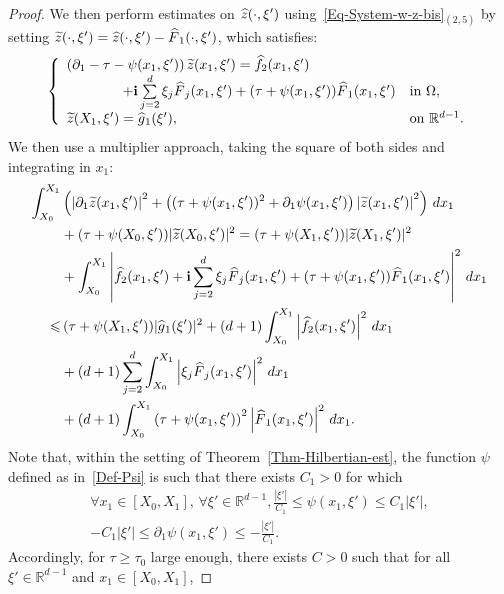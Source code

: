 \documentclass[AHL,Unicode,longabstracts]{cedram}
\newcommand*\R{\mathbb{R}}
\renewcommand{\i}{\mathbf{i}}
\renewcommand{\leq}{\leqslant}
\renewcommand{\geq}{\geqslant}
\renewcommand{\tilde}{\widetilde}
\renewcommand{\hat}{\widehat}
\let\oldtilde\tilde
\renewcommand*{\tilde}[1]{\mathchoice{\widetilde{#1}}{\widetilde{#1}}{\oldtilde{#1}}{\oldtilde{#1}}}
\let\oldhat\hat
\renewcommand*{\hat}[1]{\mathchoice{\widehat{#1}}{\widehat{#1}}{\oldhat{#1}}{\oldhat{#1}}}
\let\oldforall\forall
\renewcommand*{\forall}{\mathrel{\oldforall}}
\begin{document}
\begin{proof}
We then perform estimates on $\hat z(\cdot, \xi') $ using~\eqref{Eq-System-w-z-bis}$_{(2,5)}$ by setting $\tilde z(\cdot, \xi') = \hat z(\cdot, \xi') - \hat F_1(\cdot, \xi')$, which satisfies:
\begin{equation*}\label{Eq-tilde-zs}
\left\{
\begin{array}{ll}
\left(\partial_1-\tau-\psi(x_1,\xi') \right)\tilde {z}(x_1,\xi')=\widehat f_2(x_1, \xi') \\
\qquad\qquad+ \i \sum\limits_{j=2}^d \xi_j \hat F_j(x_1, \xi') + (\tau + \psi(x_1, \xi')) \hat F_1(x_1, \xi') & \text{in } \Omega,
\\
\tilde z(X_1, \xi') = \hat g_1 (\xi'), &\text{on } \R^{d-1}.
\end{array}
\right.
\end{equation*}
We then use a multiplier approach, taking the square of both sides and integrating in $x_1$:
\begingroup
\allowdisplaybreaks
\begin{align*}
\int_{X_0}^{X_1}& \left(\left|\partial_1 \tilde z(x_1, \xi')\right|^2 + \left((\tau + \psi(x_1, \xi'))^2 + \partial_1 \psi(x_1, \xi') \right) \left|\tilde z(x_1, \xi')\right|^2\right) \, dx_1
\\
& +(\tau + \psi(X_0, \xi')) |\tilde z(X_0, \xi')|^2 = (\tau + \psi(X_1, \xi')) |\tilde z(X_1, \xi')|^2
\\
& + \int_{X_0}^{X_1} \left| \widehat f_2(x_1, \xi') + \i \sum_{j=2}^d \xi_j \hat F_j(x_1, \xi') + (\tau + \psi(x_1, \xi')) \hat F_1(x_1, \xi')\right|^2 \, dx_1
\\
\leq&\, (\tau + \psi(X_1, \xi')) |\hat g_1(\xi')|^2 + (d+1) \int_{X_0}^{X_1} \left| \widehat f_2(x_1, \xi') \right|^2 \, dx_1
\\
&+ (d+1) \sum_{j=2}^d \int_{X_0}^{X_1} \left|\xi_j \hat F_j(x_1, \xi')\right|^2 \, dx_1\\
&+ (d+1) \int_{X_0}^{X_1} \left(\tau + \psi(x_1, \xi')\right)^2 \left|\hat F_1(x_1, \xi') \right|^2 \, dx_1.
\end{align*}
\endgroup
Note that, within the setting of Theorem~\ref{Thm-Hilbertian-est}, the function $\psi$ defined as in~\eqref{Def-Psi} is such that there exists $C_1 >0$ for which
\begin{multline}\label{Equivalences-Psi-x-xi-prime}
\forall x_1 \in [X_0,X_1],\, \forall \xi' \in \R^{d-1},
\frac{|\xi'| }{C_1} \leq \psi(x_1, \xi')
\leq C_1 |\xi'|,\\
 - C_1 |\xi'| \leq \partial_1 \psi(x_1, \xi') \leq - \frac{|\xi'| }{C_1}.
\end{multline}
Accordingly, for $\tau \geq \tau_0$ large enough, there exists $C>0$ such that for all $\xi' \in \R^{d-1}$ and $x_1 \in [X_0, X_1]$,

\end{proof}
\end{document}
